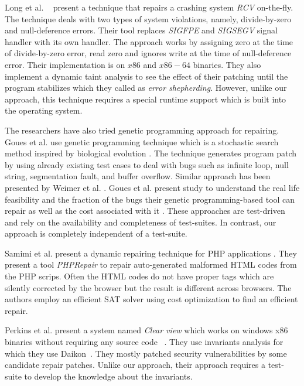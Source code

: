 Long et al. ~\cite{conf/pldi/LongSR14}
present a technique that repairs a crashing system \emph{RCV} on-the-fly.
The technique deals with two types of system violations, namely, divide-by-zero and
null-deference errors. Their tool replaces \emph{SIGFPE} and \emph{SIGSEGV}
signal handler with its own handler. The approach works by assigning zero
at the time of divide-by-zero error, read zero and ignores write at the time of
null-deference error. Their implementation is on $x86$ and $x86-64$ binaries.
They also implement a dynamic taint analysis to see the effect of their
patching until the program stabilizes which they called as \emph{error
shepherding}. However, unlike our approach, this technique requires a special runtime support which is 
built into the operating system.

The researchers have also tried genetic programming approach for repairing.
Goues et al. use genetic programming technique which is a stochastic search
method inspired by biological evolution \cite{GouesNFW12}. The technique generates program patch
by using already existing test cases to deal with bugs such as infinite loop, null
string, segmentation fault, and buffer overflow. Similar approach has been presented by 
Weimer et al. \cite{WeimerFGN10}. Goues et al. present study to understand the real life feasibility and
the fraction of the bugs their genetic programming-based tool can repair as well as the cost associated
with it \cite{GouesDFW12}. These approaches are test-driven and rely on the availability and completeness of test-suites.
In contrast, our approach is completely independent of a test-suite.

Samimi et al. present a dynamic repairing technique for PHP applications  \cite{SamirniSAMTH12}.
They present a tool \textit{PHPRepair} to repair auto-generated
malformed HTML codes from the PHP scrips. Often the HTML codes do not have
proper tags which are silently corrected by the browser but the result is
different across browsers. The authors employ an efficient SAT solver
using cost optimization to find an efficient repair.

Perkins et al. present a system named \emph{Clear view} which works on windows x86 binaries
without requiring any source code ~\cite{conf/sosp/PerkinsKLABCPSSSWZER09}.
They use invariants analysis for which they
use Daikon~\cite{DBLP:journals/scp/ErnstPGMPTX07}. They mostly patched security
vulnerabilities by some candidate repair patches. Unlike our approach, their approach requires a test-suite
to develop the knowledge about the invariants.

